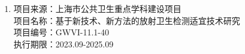 \begin{projects}
        \begin{enumerate}
                \item
                      项目来源：上海市公共卫生重点学科建设项目 \\
                      项目名称：基于新技术、新方法的放射卫生检测适宜技术研究 \\
                      项目编号：GWVI-11.1-40 \\
                      执行期限：2023.09-2025.09
        \end{enumerate}
\end{projects}